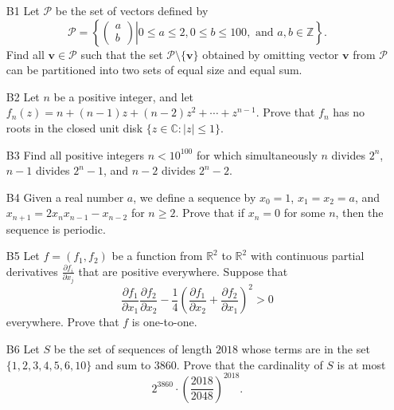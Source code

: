 \documentclass[amssymb,twocolumn,pra,10pt,aps]{revtex4-1}
\begin{document}
\begin{itemize}
\item[B1]
Let $\mathcal{P}$ be the set of vectors defined by
\[
\mathcal{P} = \left\{ \left. \begin{pmatrix} a \\ b \end{pmatrix} \right| 0 \leq a \leq 2, 0 \leq b \leq 100, \mbox{ and } a,b \in \mathbb{Z} \right\}.
\]
Find all $\mathbf{v} \in \mathcal{P}$ such that the set $\mathcal{P} \setminus \{ \mathbf{v} \}$ obtained by omitting
vector $\mathbf{v}$ from $\mathcal{P}$ can be partitioned into two sets of equal size and equal sum. 

\item[B2]
Let $n$ be a positive integer, and let $f_n(z) = n + (n-1) z + (n-2)z^2 + \cdots + z^{n-1}$. Prove that
$f_n$ has no roots in the closed unit disk $\{z \in \mathbb{C}\colon |z| \leq 1 \}$.

\item[B3]
Find all positive integers $n < 10^{100}$ for which simultaneously $n$ divides $2^n$, $n-1$ divides $2^n-1$,
and $n-2$ divides $2^n - 2$.

\item[B4]
Given a real number $a$, we define a sequence by $x_0 = 1$, $x_1 = x_2 = a$, and $x_{n+1} = 2x_n x_{n-1} - x_{n-2}$ for $n \geq 2$. Prove that if $x_n = 0$ for some $n$, then the sequence is periodic.

\item[B5]
Let $f = (f_1, f_2)$ be a function from $\mathbb{R}^2$ to $\mathbb{R}^2$ with continuous partial derivatives
$\frac{\partial f_i}{\partial x_j}$ that are positive everywhere. Suppose that
\[
\frac{\partial f_1}{\partial x_1} \frac{\partial f_2}{\partial x_2} - \frac{1}{4} \left( \frac{\partial f_1}{\partial x_2}  + \frac{\partial f_2}{\partial x_1} \right)^2 > 0
\]
everywhere. Prove that $f$ is one-to-one.

\item[B6]
Let $S$ be the set of sequences of length $2018$ whose terms  are in the set $\{1,2,3,4,5,6,10\}$ and sum to $3860$.
Prove that the cardinality of $S$ is at most
\[
2^{3860} \cdot \left( \frac{2018}{2048} \right)^{2018}.
\]

\end{itemize}
\end{document}
